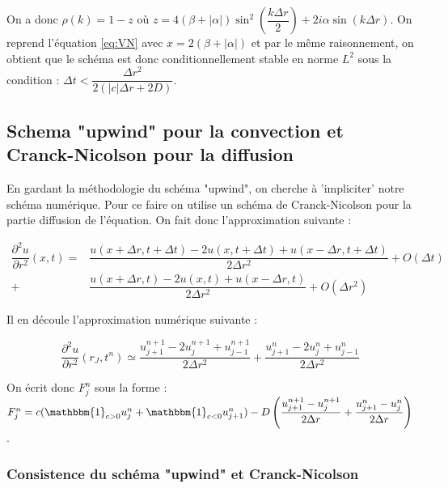 \documentclass[a4paper,fleqn,leqno]{article}
\begin{document}
On a donc $\rho(k) = 1-z$ où $z = 4(\beta + |\alpha|)\sin^2(\dfrac{k\Delta r}{2}) + 2i\alpha\sin(k\Delta r)$. On reprend l'équation \ref{eq:VN} avec $x = 2(\beta + |\alpha|)$ et par le même raisonnement, on obtient que le schéma est donc conditionnellement stable en norme $L^2$ sous la condition : $\Delta t < \dfrac{\Delta r^2}{2(|c|\Delta r + 2D)}$.




\subsection{Schema "upwind" pour la convection et Cranck-Nicolson pour la diffusion}

En gardant la méthodologie du schéma "upwind", on cherche à 'impliciter' notre schéma numérique. Pour ce faire on utilise un schéma de Cranck-Nicolson pour la partie diffusion de l'équation. On fait donc l'approximation suivante :

\begin{equation*}
\begin{array}{rl} %
\dfrac{\partial^2 u}{\partial r^2}(x,t) = & \dfrac{u(x+\Delta r,t+\Delta t) - 2u(x,t+\Delta t) + u(x-\Delta r,t+\Delta t)}{2\Delta r^2} + O(\Delta t) \\
 + & \dfrac{u(x+\Delta r,t) - 2u(x,t) + u(x-\Delta r,t)}{2\Delta r^2} + O(\Delta r^2)
\end{array}
\end{equation*}

Il en découle l'approximation numérique suivante :

\[\dfrac{\partial^2 u}{\partial r^2}(r_J,t^n) \simeq \dfrac{u^{n+1}_{j+1}-2u^{n+1}_j+u^{n+1}_{j-1}}{2\Delta r^2} + \dfrac{u^n_{j+1}-2u^n_j+u^n_{j-1}}{2\Delta r^2}\]

On écrit donc $F^n_j$ sous la forme : $F^n_j = c(\mathbbm{1}_{c>0}u^n_j + \mathbbm{1}_{c<0}u^n_{j+1}) - D\left(\dfrac{u^{n+1}_{j+1} - u^{n+1}_j}{2\Delta r} + \dfrac{u^n_{j+1} - u^n_j}{2\Delta r}\right)$.

\subsubsection{Consistence du schéma "upwind" et Cranck-Nicolson}
\end{document}
